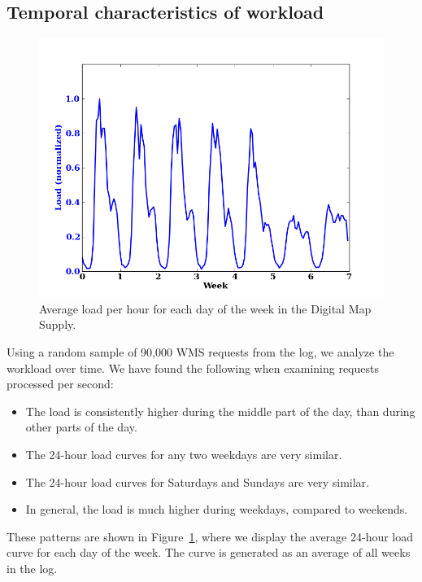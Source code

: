 \documentclass[11pt, oneside]{report}
\begin{document}
\subsection{Temporal characteristics of workload}
\label{sec:temporal:characteristics}

\begin{figure}
\centering
\includegraphics[scale=0.5]{figs-tileheat/average_load_week.png}
\caption{Average load per hour for each day of the week in the Digital Map Supply.}
\label{fig:weekload}
\end{figure}

Using a random sample of 90,000 WMS requests from the log, we analyze the workload over time. We have found the following when examining requests processed per second:

\begin{itemize}
\item The load is consistently higher during the middle part of the day, than during other parts of the day.
\item The 24-hour load curves for any two weekdays are very similar.
\item The 24-hour load curves for Saturdays and Sundays are very similar.
\item In general, the load is much higher during weekdays, compared to weekends.
\end{itemize}

These patterns are shown in Figure~\ref{fig:weekload}, where we display the average 24-hour load curve for each day of the week. The curve is generated as an average of all weeks in the log.
\end{document}
